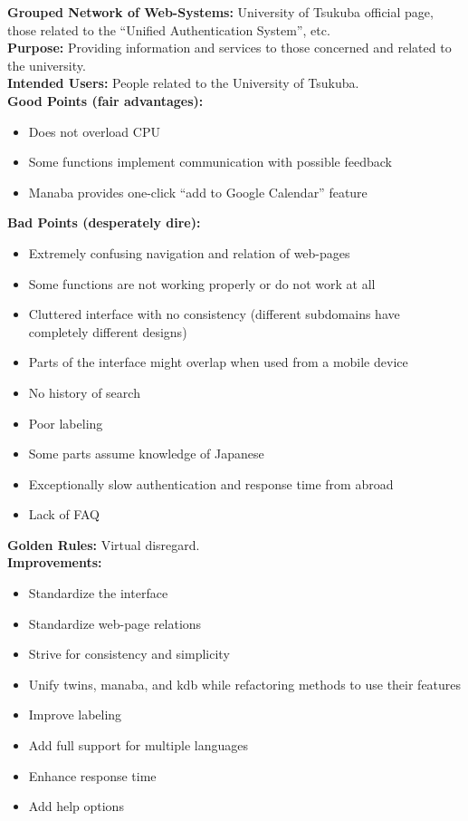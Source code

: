 \documentclass[12pt,a4paper]{article}
\begin{document}
\textbf{Grouped Network of Web-Systems:} University of Tsukuba official page, those related to the “Unified Authentication System”, etc.
\vspace{0.25cm} \\
\textbf{Purpose:} Providing information and services to those concerned and related to the university.
\vspace{0.25cm} \\
\textbf{Intended Users:} People related to the University of Tsukuba.
\vspace{0.25cm} \\
\textbf{Good Points (fair advantages):}
\begin{itemize}
    \item Does not overload CPU
    \item Some functions implement communication with possible feedback
    \item Manaba provides one-click “add to Google Calendar” feature
\end{itemize}
\textbf{Bad Points (desperately dire):}
\begin{itemize}
    \item Extremely confusing navigation and relation of web-pages
    \item Some functions are not working properly or do not work at all
    \item Cluttered interface with no consistency (different subdomains have completely different designs)
    \item Parts of the interface might overlap when used from a mobile device
    \item No history of search
    \item Poor labeling
    \item Some parts assume knowledge of Japanese
    \item Exceptionally slow authentication and response time from abroad
    \item Lack of FAQ
\end{itemize}
\textbf{Golden Rules:} Virtual disregard.
\vspace{0.25cm} \\
\textbf{Improvements:}
\begin{itemize}
    \item Standardize the interface
    \item Standardize web-page relations
    \item Strive for consistency and simplicity
    \item Unify twins, manaba, and kdb while refactoring methods to use their features
    \item Improve labeling
    \item Add full support for multiple languages
    \item Enhance response time
    \item Add help options
\end{itemize}
\end{document}

